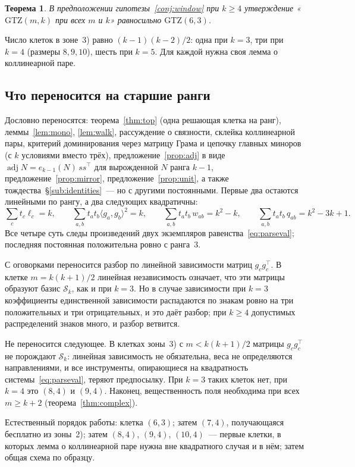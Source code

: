 \documentclass[11pt,a4paper]{article}
\theoremstyle{plain}
\newtheorem{theorem}{Теорема}[section]
\theoremstyle{definition}
\theoremstyle{remark}
\DeclareMathOperator{\adj}{adj}
\newcommand{\GTZ}{\mathrm{GTZ}}
\newcommand{\Sk}{\mathcal{S}}
\newcommand{\T}{^{\!\top}}
\begin{document}
\begin{theorem}\label{thm:everyrank}
В предположении гипотезы~\ref{conj:window} при $k\ge4$ утверждение
«$\GTZ(m,k)$ при всех $m$ и $k$» равносильно $\GTZ(6,3)$.
\end{theorem}

Число клеток в зоне~3) равно $(k-1)(k-2)/2$: одна при $k=3$, три при $k=4$
(размеры $8,9,10$), шесть при $k=5$. Для каждой нужна своя лемма о
коллинеарной паре.

\subsection{Что переносится на старшие ранги}

Дословно переносятся: теорема~\ref{thm:top} (одна решающая клетка на ранг),
леммы~\ref{lem:mono}, \ref{lem:walk}, рассуждение о связности, склейка
коллинеарной пары, критерий доминирования через матрицу Грама и цепочку
главных миноров (с $k$ условиями вместо трёх), предложение~\ref{prop:adj} в
виде $\adj N=e_{k-1}(N)\,ss\T$ для вырожденной $N$ ранга $k-1$,
предложение~\ref{prop:mirror}, предложение~\ref{prop:unit}, а также
тождества~\S\ref{sub:identities}~--- но с другими постоянными. Первые два
остаются линейными по рангу, а два следующих квадратичны:
\[
  \sum_c t_c\ell_c=k,\qquad
  \sum_{a,b}t_at_b\langle g_a,g_b\rangle^2=k,\qquad
  \sum_{a,b}t_at_b\,w_{ab}=k^2-k,\qquad
  \sum_{a,b}t_at_b\,q_{ab}=k^2-3k+1 .
\]
Все четыре суть следы произведений двух экземпляров равенства~\eqref{eq:parseval};
последняя постоянная положительна ровно с ранга~3.

С оговорками переносится разбор по линейной зависимости матриц $g_cg_c\T$.
В клетке $m=k(k+1)/2$ линейная независимость означает, что эти матрицы
образуют базис $\Sk_k$, как и при $k=3$. Но в случае зависимости при $k=3$
коэффициенты единственной зависимости распадаются по знакам ровно на три
положительных и три отрицательных, и это даёт разбор; при $k\ge4$ допустимых
распределений знаков много, и разбор ветвится.

Не переносится следующее. В клетках зоны~3) с $m<k(k+1)/2$ матрицы
$g_cg_c\T$ не порождают $\Sk_k$: линейная зависимость не обязательна, веса не
определяются направлениями, и все инструменты, опирающиеся на квадратность
системы~\eqref{eq:parseval}, теряют предпосылку. При $k=3$ таких клеток нет,
при $k=4$ это $(8,4)$ и $(9,4)$. Наконец, вещественность поля необходима при
всех $m\ge k+2$ (теорема~\ref{thm:complex}).

Естественный порядок работы: клетка $(6,3)$; затем $(7,4)$, получающаяся
бесплатно из зоны~2); затем $(8,4)$, $(9,4)$, $(10,4)$~--- первые клетки, в
которых лемма о коллинеарной паре нужна вне квадратного случая и в нём;
затем общая схема по образцу.
\end{document}
